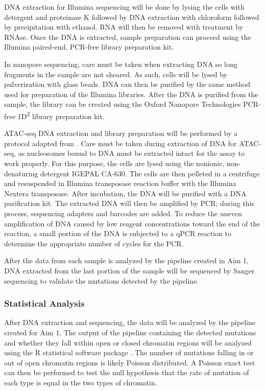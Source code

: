 DNA extraction for Illumina sequencing will be done by lysing the cells with detergent and proteinase K followed by DNA extraction with chloroform followed by precipitation with ethanol. RNA will then be removed with treatment by RNAse. Once the DNA is extracted, sample preparation can proceed using the Illumina paired-end, PCR-free library preparation kit.

In nanopore sequencing, care must be taken when extracting DNA so long fragments in the sample are not sheared. As such, cells will be lysed by pulverization with glass beads. DNA can then be purified by the same method used for preparation of the Illumina libraries. After the DNA is purified from the sample, the library can be created using the Oxford Nanopore Technologies PCR-free 1D\textsuperscript{2} library preparation kit. 

ATAC-seq DNA extraction and library preparation will be performed by a protocol adapted from \cite{buenrostro_atac-seq:_2015}.
Care must be taken during extraction of DNA for ATAC-seq, as nucleosomes bound to DNA must be extracted intact for the assay to work properly. For this purpose, the cells are lysed using the nonionic, non-denaturing detergent IGEPAL CA-630. The cells are then pelleted in a centrifuge and resuspended in Illumina transposase reaction buffer with the Illumina Nextera transposase. After incubation, the DNA will be purified with a DNA purification kit. The extracted DNA will then be amplified by PCR; during this process, sequencing adapters and barcodes are added. To reduce the uneven amplification of DNA caused by low reagent concentrations toward the end of the reaction, a small portion of the DNA is subjected to a qPCR reaction to determine the appropriate number of cycles for the PCR.

After the data from each sample is analyzed by the pipeline created in Aim 1, DNA extracted from the last portion of the sample will be sequenced by Sanger sequencing to validate the mutations detected by the pipeline.

\subsubsection{Statistical Analysis}

After DNA extraction and sequencing, the data will be analyzed by the pipeline created for Aim 1. The output of the pipeline containing the detected mutations and whether they fall within open or closed chromatin regions will be analyzed using the R statistical software package \parencite{r_stats}.
The number of mutations falling in or out of open chromatin regions is likely Poisson distributed. A Poisson exact test can then be performed to test the null hypothesis that the rate of mutation of each type is equal in the two types of chromatin.

